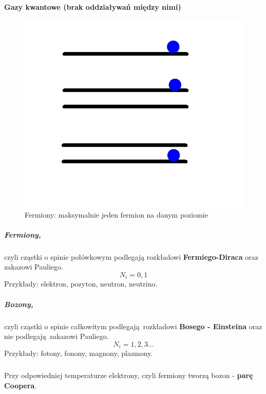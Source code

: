 \documentclass{article}
\begin{document}
		\paragraph{Gazy kwantowe (brak oddziaływań między nimi)}
	\begin{figure}[ht]
		\label{fig:fig1}
		\centering
		\includegraphics[scale=0.5]{gazy_kwantowe.jpeg}
		\caption{Fermiony: maksymalnie jeden fermion na danym poziomie}
	\end{figure}		
		\subparagraph{Fermiony,} czyli cząstki o spinie połówkowym podlegają rozkładowi \textbf{Fermiego-Diraca} oraz zakazowi Pauliego.
		\begin{equation}
		N_i = 0,1
		\end{equation}
		Przykłady: elektron, pozyton, neutron, neutrino. 
		\subparagraph{Bozony,} czyli cząstki o spinie całkowitym podlegają rozkładowi \textbf{Bosego - Einsteina} oraz nie podlegają zakazowi Pauliego.
		\begin{equation}
		N_i = 1,2,3...
		\end{equation}
		Przykłady: fotony, fonony, magnony, plazmony.
		\subparagraph{} Przy odpowiedniej temperaturze elektrony, czyli fermiony tworzą bozon - \textbf{parę Coopera}.
\end{document}
